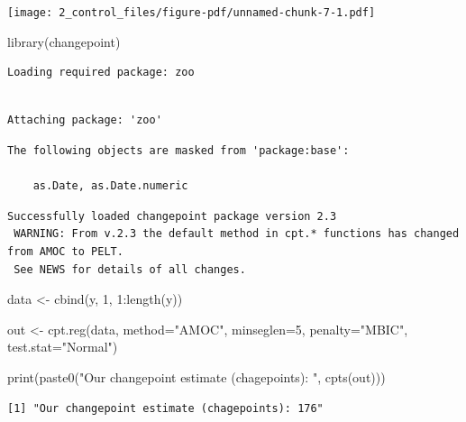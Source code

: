 \documentclass[
  letterpaper,
  DIV=11,
  numbers=noendperiod]{scrreprt}
\newenvironment{Shaded}{\begin{snugshade}}{\end{snugshade}}
\newcommand{\AttributeTok}[1]{\textcolor[rgb]{0.40,0.45,0.13}{#1}}
\newcommand{\DecValTok}[1]{\textcolor[rgb]{0.68,0.00,0.00}{#1}}
\newcommand{\FunctionTok}[1]{\textcolor[rgb]{0.28,0.35,0.67}{#1}}
\newcommand{\NormalTok}[1]{\textcolor[rgb]{0.00,0.23,0.31}{#1}}
\newcommand{\OtherTok}[1]{\textcolor[rgb]{0.00,0.23,0.31}{#1}}
\newcommand{\SpecialCharTok}[1]{\textcolor[rgb]{0.37,0.37,0.37}{#1}}
\newcommand{\StringTok}[1]{\textcolor[rgb]{0.13,0.47,0.30}{#1}}
\begin{document}
\texttt{[image: 2\_control\_files/figure-pdf/unnamed-chunk-7-1.pdf]}

\begin{Shaded}
\begin{Highlighting}[]
\FunctionTok{library}\NormalTok{(changepoint)}
\end{Highlighting}
\end{Shaded}

\begin{verbatim}
Loading required package: zoo
\end{verbatim}

\begin{verbatim}

Attaching package: 'zoo'
\end{verbatim}

\begin{verbatim}
The following objects are masked from 'package:base':

    as.Date, as.Date.numeric
\end{verbatim}

\begin{verbatim}
Successfully loaded changepoint package version 2.3
 WARNING: From v.2.3 the default method in cpt.* functions has changed from AMOC to PELT.
 See NEWS for details of all changes.
\end{verbatim}

\begin{Shaded}
\begin{Highlighting}[]
\NormalTok{data }\OtherTok{\textless{}{-}} \FunctionTok{cbind}\NormalTok{(y, }\DecValTok{1}\NormalTok{, }\DecValTok{1}\SpecialCharTok{:}\FunctionTok{length}\NormalTok{(y))}

\NormalTok{out }\OtherTok{\textless{}{-}} \FunctionTok{cpt.reg}\NormalTok{(data, }\AttributeTok{method=}\StringTok{"AMOC"}\NormalTok{, }\AttributeTok{minseglen=}\DecValTok{5}\NormalTok{, }\AttributeTok{penalty=}\StringTok{"MBIC"}\NormalTok{, }\AttributeTok{test.stat=}\StringTok{"Normal"}\NormalTok{)}

\FunctionTok{print}\NormalTok{(}\FunctionTok{paste0}\NormalTok{(}\StringTok{"Our changepoint estimate (chagepoints): "}\NormalTok{,  }\FunctionTok{cpts}\NormalTok{(out)))}
\end{Highlighting}
\end{Shaded}

\begin{verbatim}
[1] "Our changepoint estimate (chagepoints): 176"
\end{verbatim}
\end{document}
